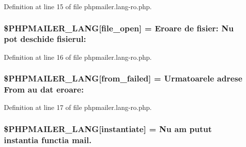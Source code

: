 Definition at line 15 of file phpmailer.\+lang-\/ro.\+php.

\subsubsection[{\texorpdfstring{\$\+P\+H\+P\+M\+A\+I\+L\+E\+R\+\_\+\+L\+A\+NG}{$PHPMAILER_LANG}}]{\setlength{\rightskip}{0pt plus 5cm}\$P\+H\+P\+M\+A\+I\+L\+E\+R\+\_\+\+L\+A\+NG\mbox{[}\textquotesingle{}file\+\_\+open\textquotesingle{}\mbox{]} = \textquotesingle{}Eroare de fisier\+: Nu pot deschide fisierul\+: \textquotesingle{}}\hypertarget{phpmailer_8lang-ro_8php_a28d1a6517bf4c942a0ddd506188ad2e0}{}\label{phpmailer_8lang-ro_8php_a28d1a6517bf4c942a0ddd506188ad2e0}


Definition at line 16 of file phpmailer.\+lang-\/ro.\+php.

\subsubsection[{\texorpdfstring{\$\+P\+H\+P\+M\+A\+I\+L\+E\+R\+\_\+\+L\+A\+NG}{$PHPMAILER_LANG}}]{\setlength{\rightskip}{0pt plus 5cm}\$P\+H\+P\+M\+A\+I\+L\+E\+R\+\_\+\+L\+A\+NG\mbox{[}\textquotesingle{}from\+\_\+failed\textquotesingle{}\mbox{]} = \textquotesingle{}Urmatoarele adrese From au dat eroare\+: \textquotesingle{}}\hypertarget{phpmailer_8lang-ro_8php_adf832ae12155a09be077c6d5e4fd7e22}{}\label{phpmailer_8lang-ro_8php_adf832ae12155a09be077c6d5e4fd7e22}


Definition at line 17 of file phpmailer.\+lang-\/ro.\+php.

\subsubsection[{\texorpdfstring{\$\+P\+H\+P\+M\+A\+I\+L\+E\+R\+\_\+\+L\+A\+NG}{$PHPMAILER_LANG}}]{\setlength{\rightskip}{0pt plus 5cm}\$P\+H\+P\+M\+A\+I\+L\+E\+R\+\_\+\+L\+A\+NG\mbox{[}\textquotesingle{}instantiate\textquotesingle{}\mbox{]} = \textquotesingle{}Nu am putut instantia functia mail.\textquotesingle{}}\hypertarget{phpmailer_8lang-ro_8php_ad58dde16780f4770ccf4dd282ea1f5ad}{}\label{phpmailer_8lang-ro_8php_ad58dde16780f4770ccf4dd282ea1f5ad}


